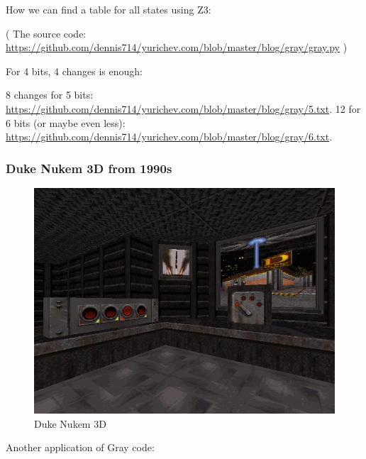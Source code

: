 How we can find a table for all states using Z3:



( The source code: \url{https://github.com/dennis714/yurichev.com/blob/master/blog/gray/gray.py} )

For 4 bits, 4 changes is enough:



8 changes for 5 bits: \url{https://github.com/dennis714/yurichev.com/blob/master/blog/gray/5.txt}.
12 for 6 bits (or maybe even less): 
\url{https://github.com/dennis714/yurichev.com/blob/master/blog/gray/6.txt}.

\subsubsection{Duke Nukem 3D from 1990s}

\begin{figure}[H]
\centering
\includegraphics[scale=3]{SMT/gray/duke.png}
\caption{Duke Nukem 3D}
\end{figure}

Another application of Gray code:


